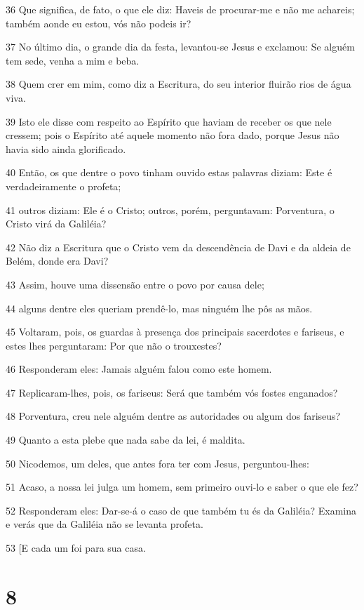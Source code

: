 \par 36 Que significa, de fato, o que ele diz: Haveis de procurar-me e não me achareis; também aonde eu estou, vós não podeis ir?
\par 37 No último dia, o grande dia da festa, levantou-se Jesus e exclamou: Se alguém tem sede, venha a mim e beba.
\par 38 Quem crer em mim, como diz a Escritura, do seu interior fluirão rios de água viva.
\par 39 Isto ele disse com respeito ao Espírito que haviam de receber os que nele cressem; pois o Espírito até aquele momento não fora dado, porque Jesus não havia sido ainda glorificado.
\par 40 Então, os que dentre o povo tinham ouvido estas palavras diziam: Este é verdadeiramente o profeta;
\par 41 outros diziam: Ele é o Cristo; outros, porém, perguntavam: Porventura, o Cristo virá da Galiléia?
\par 42 Não diz a Escritura que o Cristo vem da descendência de Davi e da aldeia de Belém, donde era Davi?
\par 43 Assim, houve uma dissensão entre o povo por causa dele;
\par 44 alguns dentre eles queriam prendê-lo, mas ninguém lhe pôs as mãos.
\par 45 Voltaram, pois, os guardas à presença dos principais sacerdotes e fariseus, e estes lhes perguntaram: Por que não o trouxestes?
\par 46 Responderam eles: Jamais alguém falou como este homem.
\par 47 Replicaram-lhes, pois, os fariseus: Será que também vós fostes enganados?
\par 48 Porventura, creu nele alguém dentre as autoridades ou algum dos fariseus?
\par 49 Quanto a esta plebe que nada sabe da lei, é maldita.
\par 50 Nicodemos, um deles, que antes fora ter com Jesus, perguntou-lhes:
\par 51 Acaso, a nossa lei julga um homem, sem primeiro ouvi-lo e saber o que ele fez?
\par 52 Responderam eles: Dar-se-á o caso de que também tu és da Galiléia? Examina e verás que da Galiléia não se levanta profeta.
\par 53 [E cada um foi para sua casa.

\chapter{8}

